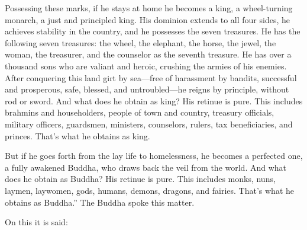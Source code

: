\documentclass[12pt,openany]{book}%
\begin{document}
Possessing these marks, if he stays at home he becomes a king, a wheel-turning monarch, a just and principled king. His dominion extends to all four sides, he achieves stability in the country, and he possesses the seven treasures. He has the following seven treasures: the wheel, the elephant, the horse, the jewel, the woman, the treasurer, and the counselor as the seventh treasure. He has over a thousand sons who are valiant and heroic, crushing the armies of his enemies. After conquering this land girt by sea—free of harassment by bandits, successful and prosperous, safe, blessed, and untroubled—he reigns by principle, without rod or sword. And what does he obtain as king? His retinue is pure. This includes brahmins and householders, people of town and country, treasury officials, military officers, guardsmen, ministers, counselors, rulers, tax beneficiaries, and princes. That’s what he obtains as king. 

But if he goes forth from the lay life to homelessness, he becomes a perfected one, a fully awakened Buddha, who draws back the veil from the world. And what does he obtain as Buddha? His retinue is pure. This includes monks, nuns, laymen, laywomen, gods, humans, demons, dragons, and fairies. That’s what he obtains as Buddha.” The Buddha spoke this matter. 

On this it is said: 
\end{document}
